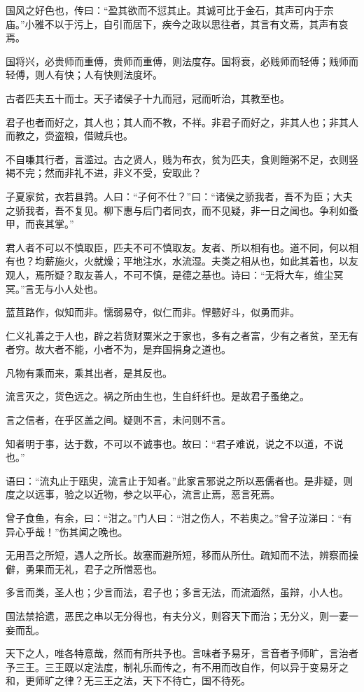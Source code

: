 \documentclass[]{article}
\begin{document}
国风之好色也，传曰：``盈其欲而不愆其止。其诚可比于金石，其声可内于宗庙。''小雅不以于污上，自引而居下，疾今之政以思往者，其言有文焉，其声有哀焉。

国将兴，必贵师而重傅，贵师而重傅，则法度存。国将衰，必贱师而轻傅；贱师而轻傅，则人有快；人有快则法度坏。

古者匹夫五十而士。天子诸侯子十九而冠，冠而听治，其教至也。

君子也者而好之，其人也；其人而不教，不祥。非君子而好之，非其人也；非其人而教之，赍盗粮，借贼兵也。

不自嗛其行者，言滥过。古之贤人，贱为布衣，贫为匹夫，食则饘粥不足，衣则竖褐不完；然而非礼不进，非义不受，安取此？

子夏家贫，衣若县鹑。人曰：``子何不仕？''曰：``诸侯之骄我者，吾不为臣；大夫之骄我者，吾不复见。柳下惠与后门者同衣，而不见疑，非一日之闻也。争利如蚤甲，而丧其掌。''

君人者不可以不慎取臣，匹夫不可不慎取友。友者、所以相有也。道不同，何以相有也？均薪施火，火就燥；平地注水，水流湿。夫类之相从也，如此其着也，以友观人，焉所疑？取友善人，不可不慎，是德之基也。诗曰：``无将大车，维尘冥冥。''言无与小人处也。

蓝苴路作，似知而非。懦弱易夺，似仁而非。悍戆好斗，似勇而非。

仁义礼善之于人也，辟之若货财粟米之于家也，多有之者富，少有之者贫，至无有者穷。故大者不能，小者不为，是弃国捐身之道也。

凡物有乘而来，乘其出者，是其反也。

流言灭之，货色远之。祸之所由生也，生自纤纤也。是故君子蚤绝之。

言之信者，在乎区盖之间。疑则不言，未问则不言。

知者明于事，达于数，不可以不诚事也。故曰：``君子难说，说之不以道，不说也。''

语曰：``流丸止于瓯臾，流言止于知者。''此家言邪说之所以恶儒者也。是非疑，则度之以远事，验之以近物，参之以平心，流言止焉，恶言死焉。

曾子食鱼，有余，曰：``泔之。''门人曰：``泔之伤人，不若奥之。''曾子泣涕曰：``有异心乎哉！''伤其闻之晚也。

无用吾之所短，遇人之所长。故塞而避所短，移而从所仕。疏知而不法，辨察而操僻，勇果而无礼，君子之所憎恶也。

多言而类，圣人也；少言而法，君子也；多言无法，而流湎然，虽辩，小人也。

国法禁拾遗，恶民之串以无分得也，有夫分义，则容天下而治；无分义，则一妻一妾而乱。

天下之人，唯各特意哉，然而有所共予也。言味者予易牙，言音者予师旷，言治者予三王。三王既以定法度，制礼乐而传之，有不用而改自作，何以异于变易牙之和，更师旷之律？无三王之法，天下不待亡，国不待死。
\end{document}
